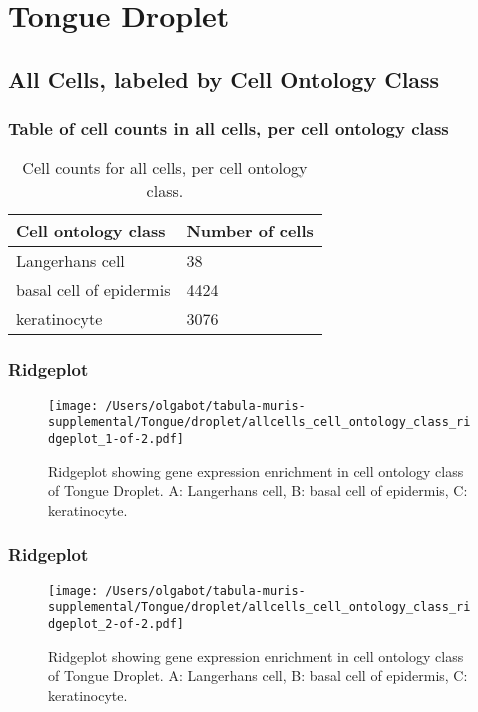 \newpage
\section{Tongue Droplet}

\subsection{All Cells, labeled by Cell Ontology Class}
\subsubsection{Table of cell counts in all cells, per cell ontology class}\begin{table}[h]
\centering
\label{my-label}
\begin{tabular}{@{}ll@{}}
\toprule

Cell ontology class& Number of cells \\ \midrule
Langerhans cell & 38 \\

basal cell of epidermis & 4424 \\

keratinocyte & 3076 \\
\bottomrule
\end{tabular}
\caption{Cell counts for all cells, per cell ontology class.}
\end{table}

\newpage
\subsubsection{Ridgeplot}
\begin{figure}[h]
\centering
\texttt{[image: /Users/olgabot/tabula-muris-supplemental/Tongue/droplet/allcells\_cell\_ontology\_class\_ridgeplot\_1-of-2.pdf]}

\caption{ Ridgeplot  showing gene expression enrichment in cell ontology class of Tongue Droplet. A: Langerhans cell, B: basal cell of epidermis, C: keratinocyte.}
\end{figure}


\newpage
\newpage
\subsubsection{Ridgeplot}
\begin{figure}[h]
\centering
\texttt{[image: /Users/olgabot/tabula-muris-supplemental/Tongue/droplet/allcells\_cell\_ontology\_class\_ridgeplot\_2-of-2.pdf]}

\caption{ Ridgeplot  showing gene expression enrichment in cell ontology class of Tongue Droplet. A: Langerhans cell, B: basal cell of epidermis, C: keratinocyte.}
\end{figure}


